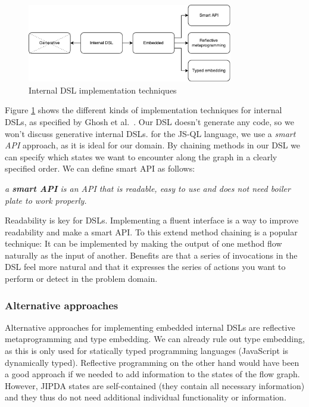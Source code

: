 \begin{figure}[!h]
    \centering
      \includegraphics[width=0.8\textwidth]{images/DSLTechniques} 
      \caption{Internal DSL implementation techniques}
    \label{fig:DSLTechniques}
\end{figure}

Figure \ref{fig:DSLTechniques} shows the different kinds of implementation techniques for internal DSLs, as specified by Ghosh et al.~\cite{Ghosh:2010}. Our DSL doesn't generate any code, so we won't discuss generative internal DSLs. for the JS-QL language, we use a \textit{smart API} approach, as it is ideal for our domain. By chaining methods in our DSL we can specify which states we want to encounter along the graph in a clearly specified order. We can define smart API as follows:

\begin{definition}
    \textit{a \textbf{smart API} is an API that is readable, easy to use and does not need boiler plate to work properly.}
\end{definition}

Readability is key for DSLs. Implementing a fluent interface is a way to improve readability and make a smart API. To this extend method chaining is a popular technique: It can be implemented by making the output of one method flow naturally as the input of another. Benefits are that a series of invocations in the DSL feel more natural and that it expresses the series of actions you want to perform or detect in the problem domain. 

\subsubsection*{Alternative approaches}

Alternative approaches for implementing embedded internal DSLs are reflective metaprogramming and type embedding.
We can already rule out type embedding, as this is only used for statically typed programming languages (JavaScript is dynamically typed). Reflective programming on the other hand would have been a good approach if we needed to add information to the states of the flow graph. However, JIPDA states are self-contained (they contain all necessary information) and they thus do not need additional individual functionality or information.

